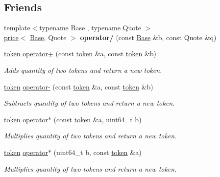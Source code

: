 \subsection*{Friends}
\begin{DoxyCompactItemize}
\item 
\mbox{\label{classaacio_1_1token_a41a71d33df920a859b6207ff7cdf304e}} 
{\footnotesize template$<$typename Base , typename Quote $>$ }\\\mbox{\hyperlink{structaacio_1_1price}{price}}$<$ \mbox{\hyperlink{struct_base}{Base}}, Quote $>$ {\bfseries operator/} (const \mbox{\hyperlink{struct_base}{Base}} \&b, const Quote \&q)
\item 
\mbox{\hyperlink{classaacio_1_1token}{token}} \mbox{\hyperlink{classaacio_1_1token_a3a4ba798d742ab3bb7c6d16a0e823ca2}{operator+}} (const \mbox{\hyperlink{classaacio_1_1token}{token}} \&a, const \mbox{\hyperlink{classaacio_1_1token}{token}} \&b)
\begin{DoxyCompactList}\small\item\em Adds quantity of two tokens and return a new token. \end{DoxyCompactList}\item 
\mbox{\hyperlink{classaacio_1_1token}{token}} \mbox{\hyperlink{classaacio_1_1token_a9070e8ee2d1bf7cae8438fceb0efcb51}{operator-\/}} (const \mbox{\hyperlink{classaacio_1_1token}{token}} \&a, const \mbox{\hyperlink{classaacio_1_1token}{token}} \&b)
\begin{DoxyCompactList}\small\item\em Subtracts quantity of two tokens and return a new token. \end{DoxyCompactList}\item 
\mbox{\hyperlink{classaacio_1_1token}{token}} \mbox{\hyperlink{classaacio_1_1token_a0008c3c01294f2ccb1f36274929f3d54}{operator$\ast$}} (const \mbox{\hyperlink{classaacio_1_1token}{token}} \&a, uint64\+\_\+t b)
\begin{DoxyCompactList}\small\item\em Multiplies quantity of two tokens and return a new token. \end{DoxyCompactList}\item 
\mbox{\hyperlink{classaacio_1_1token}{token}} \mbox{\hyperlink{classaacio_1_1token_a253f895f9329454843e808216b8b350e}{operator$\ast$}} (uint64\+\_\+t b, const \mbox{\hyperlink{classaacio_1_1token}{token}} \&a)
\begin{DoxyCompactList}\small\item\em Multiplies quantity of two tokens and return a new token. \end{DoxyCompactList}\item 

\end{DoxyCompactItemize}
